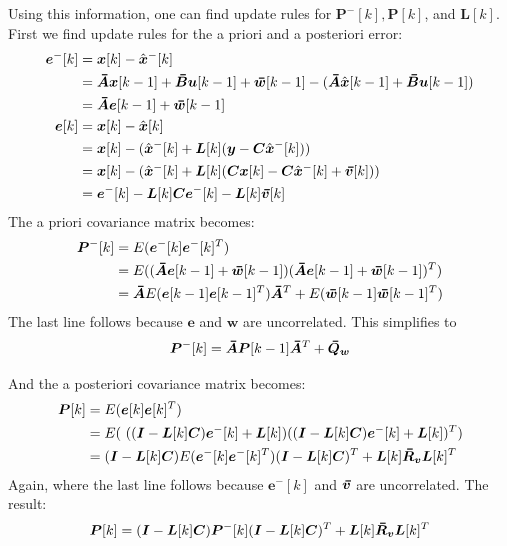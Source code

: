 Using this information, one can find update rules for $\bm{P}^-[k], \bm{P}[k]$, and $\bm{L}[k]$. First we find update rules for the a priori and a posteriori error:
\begin{align*}
    \bm{e}^-[k] &= \bm{x}[k]-\hat{\bm{x}}^-[k] \\
                &= \thickbar{\bm{A}}\bm{x}[k-1] + \thickbar{\bm{B}}\bm{u}[k-1] + \thickbar{\bm{w}}[k-1] - (\thickbar{\bm{A}}\hat{\bm{x}}[k-1] + \thickbar{\bm{B}}\bm{u}[k-1]) \\
                &= \thickbar{\bm{A}}\bm{e}[k-1] + \thickbar{\bm{w}}[k-1] \\
    \bm{e}[k]&= \bm{x}[k] -\hat{\bm{x}}[k] \\
             &= \bm{x}[k] - (\bmhat{x}^-[k]+\bm{L}[k](\bm{y}-\bm{C}\bmhat{x}^-[k])) \\
             &= \bm{x}[k] - (\bmhat{x}^-[k]+\bm{L}[k](\bm{C}\bm{x}[k] -\bm{C}\bmhat{x}^-[k]+\bmbar{v}[k])) \\
             &= \bm{e}^-[k] - \bm{L}[k]\bm{C}\bm{e}^-[k]-\bm{L}[k]\bmbar{v}[k]
\end{align*}
The a priori covariance matrix becomes:
\begin{align*}
    \bm{P}^-[k] &= E(\bm{e}^-[k]\bm{e}^-[k]^T) \\
                &= E((\thickbar{\bm{A}}\bm{e}[k-1] + \thickbar{\bm{w}}[k-1])(\thickbar{\bm{A}}\bm{e}[k-1] + \thickbar{\bm{w}}[k-1])^T) \\
                &= \thickbar{\bm{A}}E(\bm{e}[k-1]\bm{e}[k-1]^T)\thickbar{\bm{A}}^T + E(\thickbar{\bm{w}}[k-1]\thickbar{\bm{w}}[k-1]^T)
\end{align*}
The last line follows because $\bm{e}$ and $\bm{w}$ are uncorrelated. This simplifies to
\begin{equation}
\bm{P}^-[k] = \thickbar{\bm{A}}\bm{P}[k-1]\thickbar{\bm{A}}^T + \thickbar{\bm{Q}}_{\bm{w}} \label{a_priori_covariance}
\end{equation}

And the a posteriori covariance matrix becomes:
\begin{align*}
    \bm{P}[k] &= E(\bm{e}[k]\bm{e}[k]^T) \\
              &= E(\ ((\bm{I} - \bm{L}[k]\bm{C})\bm{e}^-[k]+\bm{L}[k])((\bm{I} - \bm{L}[k]\bm{C})\bm{e}^-[k]+\bm{L}[k])^T) \\
              &= (\bm{I} - \bm{L}[k]\bm{C})E(\bm{e}^-[k]\bm{e}^-[k]^T)(\bm{I} - \bm{L}[k]\bm{C})^T + \bm{L}[k]\bmbar{R}_{\bm{v}}\bm{L}[k]^T
\end{align*}
Again, where the last line follows because $\bm{e}^-[k]$ and $\bmbar{v}$ are uncorrelated. The result:
\begin{equation}
              \bm{P}[k] = (\bm{I} - \bm{L}[k]\bm{C})\bm{P}^-[k](\bm{I} - \bm{L}[k]\bm{C})^T + \bm{L}[k]\bmbar{R}_{\bm{v}}\bm{L}[k]^T \label{a_posteriori_covariance}
\end{equation}

